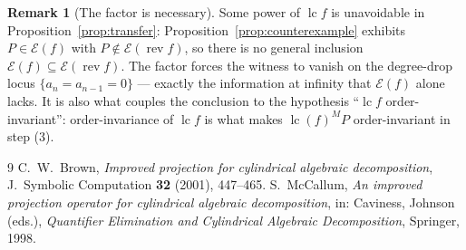 \documentclass[11pt,a4paper]{article}
\theoremstyle{definition}
\newtheorem{remark}[theorem]{Remark}
\newcommand{\lc}{\operatorname{lc}}
\newcommand{\rev}{\operatorname{rev}}
\newcommand{\E}{\mathcal{E}}
\begin{document}
\begin{remark}[The factor is necessary]\label{rem:price}
Some power of $\lc f$ is unavoidable in Proposition~\ref{prop:transfer}:
Proposition~\ref{prop:counterexample} exhibits $P \in \E(f)$ with
$P \notin \E(\rev f)$, so there is no general inclusion
$\E(f) \subseteq \E(\rev f)$. The factor forces the witness to vanish on the
degree-drop locus $\{a_n = a_{n-1} = 0\}$ --- exactly the information at
infinity that $\E(f)$ alone lacks. It is also what couples the conclusion to
the hypothesis ``$\lc f$ order-invariant'': order-invariance of $\lc f$ is what
makes $\lc(f)^M P$ order-invariant in step (3).
\end{remark}

\begin{thebibliography}{9}
 C.~W.~Brown,
  \emph{Improved projection for cylindrical algebraic decomposition},
  J.~Symbolic Computation \textbf{32} (2001), 447--465.
 S.~McCallum,
  \emph{An improved projection operator for cylindrical algebraic
  decomposition}, in: Caviness, Johnson (eds.), \emph{Quantifier Elimination
  and Cylindrical Algebraic Decomposition}, Springer, 1998.
\end{thebibliography}
\end{document}
